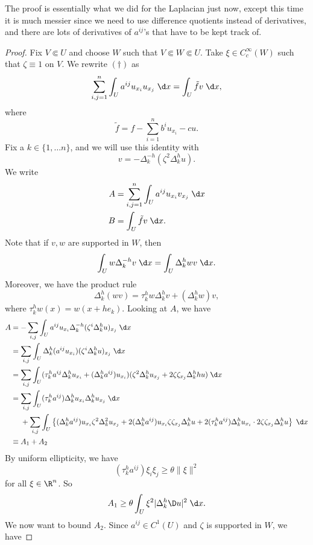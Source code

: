 \documentclass[a4paper]{article}
\begin{document}
The proof is essentially what we did for the Laplacian just now, except this time it is much messier since we need to use difference quotients instead of derivatives, and there are lots of derivatives of $a^{ij}$'s that have to be kept track of.
\begin{proof}
  Fix $V \Subset U$ and choose $W$ such that $V \Subset W \Subset U$. Take $\xi \in C_c^\infty(W)$ such that $\zeta \equiv 1$ on $V$. We rewrite $(\dagger)$ as
  \[
    \sum_{i, j = 1}^n \int_U a^{ij} u_{x_i} u_{x_j} \;\d x = \int_U \tilde{f} v\;\d x,
  \]
  where
  \[
    \tilde{f} = f - \sum_{i = 1}^n b^i u_{x_i} - cu.
  \]
  Fix a $k \in \{1, \ldots n\}$, and we will use this identity with
  \[
    v = - \Delta_k^{-h} (\zeta^2 \Delta_k^h u).
  \]
  We write
  \begin{align*}
    A &= \sum_{i, j = 1}^n \int_U a^{ij} u_{x_i} v_{x_j} \;\d x\\
    B &= \int_U \tilde{f} v\;\d x.
  \end{align*}
  Note that if $v, w$ are supported in $W$, then 
  \[
    \int_U w \Delta_k^{-h}v\;\d x = \int_U \Delta^h_k w v\;\d x.
  \]
  Moreover, we have the product rule
  \[
    \Delta^h_k(w v) = \tau_k^h w \Delta_k^h v + (\Delta_k^h w) v,
  \]
  where $\tau_k^h w (x) = w(x + h e_k)$. Looking at $A$, we have
  \begin{align*}
    A &= - \sum_{i, j} \int_U a^{ij} u_{x_i} \Delta_k^{-h} (\zeta^i \Delta_k^h u)_{x_j}\;\d x\\
    &= \sum_{i, j} \int_U \Delta^h_k (a^{ij} u_{x_i}) (\zeta^i \Delta_k^h u)_{x_j}\;\d x\\
    &= \sum_{i, j} \int_U (\tau^h_k a^{ij} \Delta_k^h u_{x_i} + (\Delta_k^h a^{ij}) u_{x_i}) (\zeta^2 \Delta^h_k u_{x_j} + 2 \zeta \zeta_{x_j} \Delta_k^hh u)\;\d x\\
    &= \sum_{i, j} \int_U (\tau_k^h a^{ij}) \Delta_k^h u_{x_i} \Delta_k^h u_{x_j}\;\d x\\
    &\hphantom{{}={}} + \sum_{i, j} \int_U \left\{ (\Delta^h_k a^{ij}) u_{x_i} \zeta^2 \Delta_k^2 u_{x_j} + 2(\Delta_k^h a^{ij}) u_{x_i} \zeta \zeta_{x_j} \Delta_k^h u + 2(\tau_k^h a^{ij}) \Delta^h_k u_{x_i} \cdot 2 \zeta \zeta_{x_j} \Delta_k^h u \right\}\;\d x\\ %
    &\equiv A_1 + A_2
  \end{align*}
  By uniform ellipticity, we have
  \[
    (\tau_k^h a^{ij}) \xi_i \xi_j \geq \theta \|\xi\|^2
  \]
  for all $\xi \in \R^n$. So
  \[
    A_1 \geq \theta \int_U \xi^2 |\Delta^h_k \D u|^2\;\d x.
  \]
  We now want to bound $A_2$. Since $a^{ij} \in C^1(U)$ and $\zeta$ is supported in $W$, we have

\end{proof}
\end{document}
